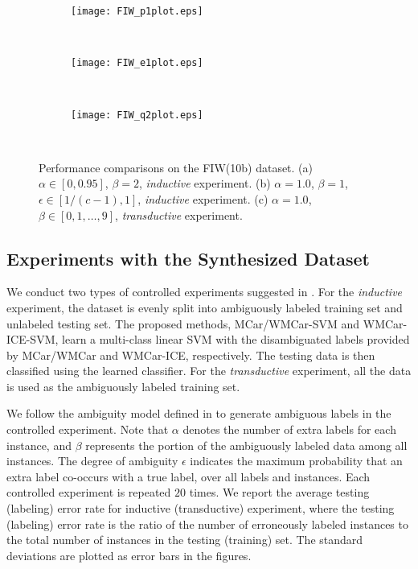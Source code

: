 \documentclass[10pt,journal,compsoc]{IEEEtran}
\begin{document}
\begin{figure*}
        \centering
        \begin{subfigure}[b]{0.32\textwidth}
                \texttt{[image: FIW\_p1plot.eps]}
                \caption{}\label{fig:fiw10b_a}
        \end{subfigure}\,
        \begin{subfigure}[b]{0.32\textwidth}
                \texttt{[image: FIW\_e1plot.eps]}
                \caption{}\label{fig:fiw10b_b}
        \end{subfigure}\,
       \begin{subfigure}[b]{0.32\textwidth}
                \texttt{[image: FIW\_q2plot.eps]}
                \caption{}\label{fig:fiw10b_c}
        \end{subfigure}\,
        \caption{Performance comparisons on the FIW(10b) dataset. (a) $\alpha \in [0, 0.95]$, $\beta=2$, \emph{inductive} experiment. (b) $\alpha= 1.0$, $\beta =1$, $\epsilon \in [1/(c-1), 1]$, \emph{inductive} experiment. (c) $\alpha= 1.0$, $\beta  \in [0,1, \dots, 9]$, \emph{transductive} experiment.}
        \label{fig:lfw_set}
\end{figure*}

\subsection{Experiments with the Synthesized Dataset}
We conduct two types of controlled experiments suggested in \cite{Cour2011}.  For the \emph{inductive} experiment, the dataset is evenly split into ambiguously labeled training set and unlabeled testing set. The proposed methods, MCar/WMCar-SVM and WMCar-ICE-SVM, learn a multi-class linear SVM \cite{CC01a} with the disambiguated labels provided by MCar/WMCar and WMCar-ICE, respectively. The testing data is then classified using the learned classifier.
For the \emph{transductive} experiment, all the data is used as the ambiguously labeled training set.

We follow the ambiguity model defined in \cite{Cour2011} to generate ambiguous labels in the controlled experiment. Note that $\alpha$ denotes the number of extra labels for each instance, and $\beta$ represents the portion of the ambiguously labeled data among all instances. The degree of ambiguity $\epsilon$ indicates the maximum probability that an extra label co-occurs with a true label, over all labels and instances. Each controlled experiment is repeated $20$ times.
We report the average testing (labeling) error rate for inductive (transductive) experiment, where the testing (labeling) error rate is the ratio of the number of erroneously labeled instances to the total number of instances in the testing (training) set. The standard deviations are plotted as error bars in the figures.
\end{document}

